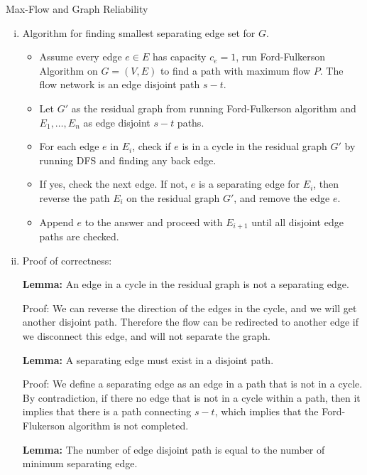 \documentclass{article}
\numberwithin{table}{section}
\numberwithin{figure}{section}
\begin{document}
\begin{section}{Max-Flow and Graph Reliability}
\begin{enumerate}
    \begin{tcolorbox}
        \begin{enumerate}[(i)]
            \item Algorithm for finding smallest separating edge set for $G$.
            
            \begin{itemize}
                \item Assume every edge $e \in E$ has capacity $c_e = 1$, run Ford-Fulkerson Algorithm on $G = (V, E)$ to find a path with maximum flow $P$. The flow network is an edge disjoint path $s-t$.
                \item Let $G'$ as the residual graph from running Ford-Fulkerson algorithm and  $E_1, \dots, E_n$ as edge disjoint $s-t$ paths. 
                \item For each edge $e$ in  $E_i$, check if $e$ is in a cycle in the residual graph $G'$ by running DFS and finding any back edge. 
                \item If yes, check the next edge. If not, $e$ is a separating edge for $E_i$, then reverse the path $E_i$ on the residual graph $G'$, and remove the edge $e$. 
                \item Append $e$ to the answer and proceed with $E_{i+1}$ until all disjoint edge paths are checked.
            \end{itemize}

            \item Proof of correctness:
            
            \textbf{Lemma:} An edge in a cycle in the residual graph is not a separating edge.

            Proof: We can reverse the direction of the edges in the cycle, and we will get another disjoint path. Therefore the flow can be redirected to another edge if we disconnect this edge, and will not separate the graph.

            \textbf{Lemma:} A separating edge must exist in a disjoint path. 

            Proof: We define a separating edge as an edge in a path that is not in a cycle. By contradiction, if there no edge that is not in a cycle within a path, then it implies that there is a path connecting $s-t$, which implies that the Ford-Flukerson algorithm is not completed.

            \textbf{Lemma:} The number of edge disjoint path is equal to the number of minimum separating edge.


\end{enumerate}
\end{tcolorbox}
\end{enumerate}
\end{section}
\end{document}
